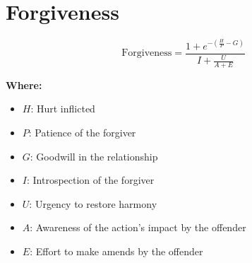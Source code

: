 \chapter{Forgiveness}

\begin{equation}
\text{Forgiveness} = \frac{1 + e^{-\left(\frac{H}{P} - G\right)}}{I + \frac{U}{A + E}}
\end{equation}

\textbf{Where:}

\begin{itemize}
    \item $H$: Hurt inflicted
    \item $P$: Patience of the forgiver
    \item $G$: Goodwill in the relationship
    \item $I$: Introspection of the forgiver
    \item $U$: Urgency to restore harmony
    \item $A$: Awareness of the action's impact by the offender
    \item $E$: Effort to make amends by the offender
\end{itemize}